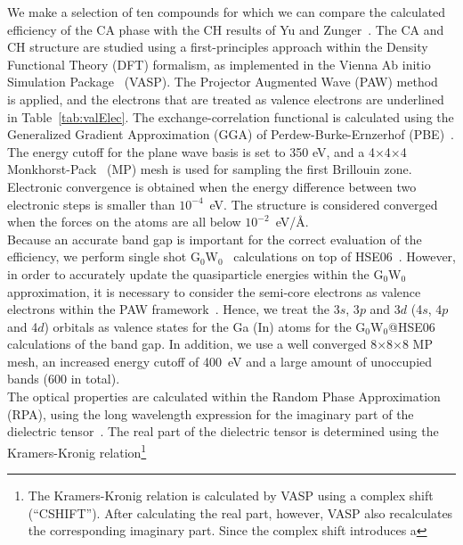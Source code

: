 \begin{refsection}
We make a selection of ten compounds for which we can compare the calculated 
efficiency of the CA phase with the CH results of Yu and Zunger~\cite{Yu2012}. 
The CA and CH structure are studied using a first-principles approach within 
the Density Functional Theory (DFT) formalism, as implemented in the Vienna Ab 
initio Simulation Package~\cite{Kresse1993, Kresse1996, Kresse1996b} (VASP). 
The Projector Augmented Wave (PAW) method~\cite{Blochl1994} is applied, and the 
electrons that are treated as valence electrons are underlined in 
Table~\ref{tab:valElec}. The exchange-correlation functional is calculated 
using the Generalized Gradient Approximation (GGA) of Perdew-Burke-Ernzerhof 
(PBE)~\cite{Perdew1996}. The energy cutoff for the plane wave basis is set to 
350 eV, and a 4$\times$4$\times$4 Monkhorst-Pack~\cite{Monkhorst1976} (MP) 
mesh is used for sampling the first Brillouin zone. Electronic convergence is 
obtained when the energy difference between two electronic steps is smaller 
than $10^{-4}$~\si{\electronvolt}. The structure is considered converged when 
the forces on the atoms are all below 
$10^{-2}$~\si{\electronvolt}/\si{\angstrom}. \\\vspace{0.5em} 
Because an accurate band gap is important for the correct evaluation of the 
efficiency, we perform single shot G$_0$W$_0$~\cite{Hybertsen1985} 
calculations on top of HSE06~\cite{Heyd2006}. However, in order to accurately 
update the quasiparticle energies within the G$_0$W$_0$ approximation, it is 
necessary to consider the semi-core electrons as valence electrons within the 
PAW framework~\cite{Fuchs2007}. Hence, we treat the 3$s$, 3$p$ and 3$d$ (4$s$, 
4$p$ and 4$d$) orbitals as valence states for the Ga (In) atoms for the 
G$_0$W$_0$@HSE06 calculations of the band gap. In addition, we use a well 
converged 8$\times$8$\times$8 MP mesh, an increased energy cutoff of 
400~\si{\electronvolt} and a large amount of unoccupied bands (600 in total). 
\\\vspace{0.5em} 
The optical properties are calculated within the Random Phase Approximation 
(RPA), using the long wavelength expression for the imaginary part of the 
dielectric tensor~\cite{Gajdos2006, Harl2007}. The real part of the dielectric 
tensor is determined using the Kramers-Kronig relation\footnote{The 
Kramers-Kronig relation is calculated by VASP using a complex shift 
(``CSHIFT''). After calculating the real part, however, VASP also recalculates 
the corresponding imaginary part. Since the complex shift introduces a 
}
\end{refsection}
